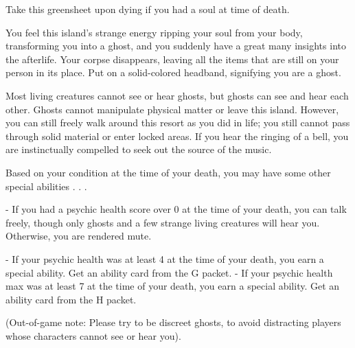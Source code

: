 \documentclass[green]{Kos}
\begin{document}
\name{\gGhost{}}

Take this greensheet upon dying if you had a soul at time of death.

You feel this island's strange energy ripping your soul from your body, transforming you into a ghost, and you suddenly have a great many insights into the afterlife. Your corpse disappears, leaving all the items that are still on your person in its place. Put on a solid-colored headband, signifying you are a ghost.

Most living creatures cannot see or hear ghosts, but ghosts can see and hear each other. Ghosts cannot manipulate physical matter or leave this island. However, you can still freely walk around this resort as you did in life; you still cannot pass through solid material or enter locked areas. If you hear the ringing of a bell, you are instinctually compelled to seek out the source of the music. 

Based on your condition at the time of your death, you may have some other special abilities . . . 

- If you had a psychic health score over 0 at the time of your death, you can talk freely, though only ghosts and a few strange living creatures will hear you. Otherwise, you are rendered mute.

- If your psychic health was at least 4 at the time of your death, you earn a special ability. Get an ability card from the G packet.
- If your psychic health max was at least 7 at the time of your death, you earn a special ability. Get an ability card from the H packet.


(Out-of-game note: Please try to be discreet ghosts, to avoid distracting players whose characters cannot see or hear you).
\end{document}
